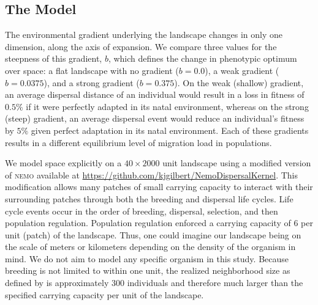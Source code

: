 \subsection{The Model}

The environmental gradient underlying the landscape changes in only one dimension, along the axis of expansion. We compare three values for the steepness of this gradient, $b$, which defines the change in phenotypic optimum over space: a flat landscape with no gradient ($b = 0.0$), a weak gradient ($b = 0.0375$), and a strong gradient ($b = 0.375$). On the weak (shallow) gradient, an average dispersal distance of an individual would result in a loss in fitness of $0.5\%$ if it were perfectly adapted in its natal environment, whereas on the strong (steep) gradient, an average dispersal event would reduce an individual's fitness by $5\%$ given perfect adaptation in its natal environment. Each of these gradients results in a different equilibrium level of migration load in populations.

We model space explicitly on a $40\times2000$ unit landscape using a modified version of \textsc{nemo} available at \url{https://github.com/kjgilbert/NemoDispersalKernel}. This modification allows many patches of small carrying capacity to interact with their surrounding patches through both the breeding and dispersal life cycles. Life cycle events occur in the order of breeding, dispersal, selection, and then population regulation. Population regulation enforced a carrying capacity of 6 per unit (patch) of the landscape. Thus, one could imagine our landscape being on the scale of meters or kilometers depending on the density of the organism in mind. %
We do not aim to model any specific organism in this study. %
Because breeding is not limited to within one unit, the realized neighborhood size as defined by \citet{Wright:1946} is approximately 300 individuals and therefore much larger than the specified carrying capacity per unit of the landscape. 


